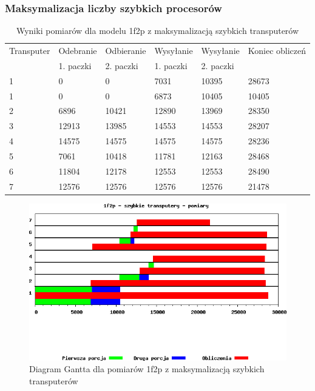 \documentclass[a4paper,11pt, titlepage]{article}
\begin{document}
\subsubsection{Maksymalizacja liczby szybkich procesorów}
\begin{table}[h!]
\begin{tabular}{|l|l|l|l|l|l|}\hline
Transputer&Odebranie&Odbieranie&Wysyłanie&Wysyłanie&Koniec obliczeń\\
&1. paczki&2. paczki&1. paczki&2. paczki&\\ \hline
1&0&0&7031&10395&28673\\ \hline
1&0&0&6873&10405&10405\\ \hline
2&6896&10421&12890&13969&28350\\ \hline
3&12913&13985&14553&14553&28207\\ \hline
4&14575&14575&14575&14575&28236\\ \hline
5&7061&10418&11781&12163&28468\\ \hline
6&11804&12178&12553&12553&28490\\ \hline
7&12576&12576&12576&12576&21478\\ \hline
\end{tabular}
\caption{Wyniki pomiarów dla modelu 1f2p z maksymalizacją szybkich transputerów \label{i2f1p_p}}
\end{table}
\begin{figure}[hp!]
\includegraphics[width=1.0\textwidth]{wykresy/i2p1f_proc}
\caption{Diagram Gantta dla pomiarów 1f2p z maksymalizacją szybkich transputerów \label{i2p1f_pg}}
\end{figure}
\end{document}
